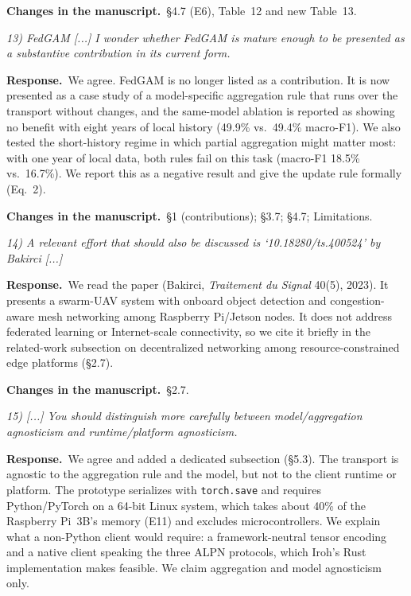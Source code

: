 \documentclass[11pt,a4paper]{article}
\newenvironment{comment}{\par\medskip\noindent\begin{minipage}{\linewidth}\color{blue!45!black}\itshape}{\end{minipage}\par}
\newcommand{\reply}{\par\smallskip\noindent\textbf{Response.}~}
\newcommand{\changes}{\par\smallskip\noindent\textbf{Changes in the manuscript.}~}
\begin{document}
\changes \S4.7 (E6), Table~12 and new Table~13.

\begin{comment}
13) FedGAM [...] I wonder whether FedGAM is mature enough to be presented as a substantive contribution in its current form.
\end{comment}
\reply We agree. FedGAM is no longer listed as a contribution. It is now presented as a case study of a model-specific aggregation rule that runs over the transport without changes, and the same-model ablation is reported as showing no benefit with eight years of local history (49.9\% vs.\ 49.4\% macro-F1). We also tested the short-history regime in which partial aggregation might matter most: with one year of local data, both rules fail on this task (macro-F1 18.5\% vs.\ 16.7\%). We report this as a negative result and give the update rule formally (Eq.~2).

\changes \S1 (contributions); \S3.7; \S4.7; Limitations.

\begin{comment}
14) A relevant effort that should also be discussed is `10.18280/ts.400524' by Bakirci [...]
\end{comment}
\reply We read the paper (Bakirci, \emph{Traitement du Signal} 40(5), 2023). It presents a swarm-UAV system with onboard object detection and congestion-aware mesh networking among Raspberry Pi/Jetson nodes. It does not address federated learning or Internet-scale connectivity, so we cite it briefly in the related-work subsection on decentralized networking among resource-constrained edge platforms (\S2.7).

\changes \S2.7.

\begin{comment}
15) [...] You should distinguish more carefully between model/aggregation agnosticism and runtime/platform agnosticism.
\end{comment}
\reply We agree and added a dedicated subsection (\S5.3). The transport is agnostic to the aggregation rule and the model, but not to the client runtime or platform. The prototype serializes with \texttt{torch.save} and requires Python/PyTorch on a 64-bit Linux system, which takes about 40\% of the Raspberry Pi~3B's memory (E11) and excludes microcontrollers. We explain what a non-Python client would require: a framework-neutral tensor encoding and a native client speaking the three ALPN protocols, which Iroh's Rust implementation makes feasible. We claim aggregation and model agnosticism only.
\end{document}
